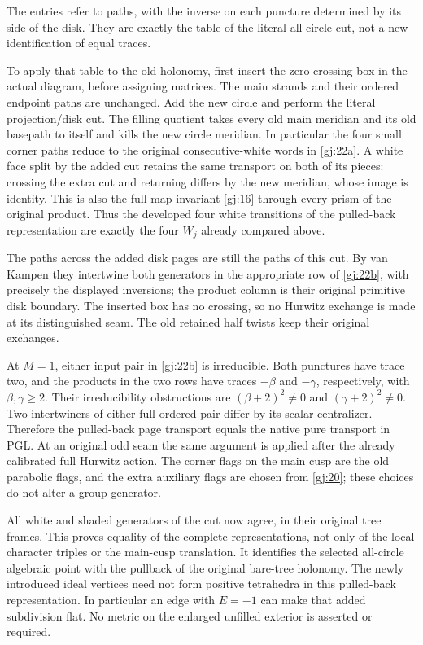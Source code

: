 The entries refer to paths, with the inverse on each puncture determined by its side of the disk. They are exactly the table of the literal all-circle cut, not a new identification of equal traces.

To apply that table to the old holonomy, first insert the zero-crossing box in the actual diagram, before assigning matrices. The main strands and their ordered endpoint paths are unchanged. Add the new circle and perform the literal projection/disk cut. The filling quotient takes every old main meridian and its old basepath to itself and kills the new circle meridian. In particular the four small corner paths reduce to the original consecutive-white words in \eqref{gj:22a}. A white face split by the added cut retains the same transport on both of its pieces: crossing the extra cut and returning differs by the new meridian, whose image is identity. This is also the full-map invariant \eqref{gj:16} through every prism of the original product. Thus the developed four white transitions of the pulled-back representation are exactly the four \(W_j\) already compared above.

The paths across the added disk pages are still the paths of this cut. By van Kampen they intertwine both generators in the appropriate row of \eqref{gj:22b}, with precisely the displayed inversions; the product column is their original primitive disk boundary. The inserted box has no crossing, so no Hurwitz exchange is made at its distinguished seam. The old retained half twists keep their original exchanges.

At \(M=1\), either input pair in \eqref{gj:22b} is irreducible. Both punctures have trace two, and the products in the two rows have traces \(-\beta\) and \(-\gamma\), respectively, with \(\beta,\gamma\ge2\). Their irreducibility obstructions are \((\beta+2)^2\ne0\) and \((\gamma+2)^2\ne0\). Two intertwiners of either full ordered pair differ by its scalar centralizer. Therefore the pulled-back page transport equals the native pure transport in PGL. At an original odd seam the same argument is applied after the already calibrated full Hurwitz action. The corner flags on the main cusp are the old parabolic flags, and the extra auxiliary flags are chosen from \eqref{gj:20}; these choices do not alter a group generator.

All white and shaded generators of the cut now agree, in their original tree frames. This proves equality of the complete representations, not only of the local character triples or the main-cusp translation. It identifies the selected all-circle algebraic point with the pullback of the original bare-tree holonomy. The newly introduced ideal vertices need not form positive tetrahedra in this pulled-back representation. In particular an edge with \(E=-1\) can make that added subdivision flat. No metric on the enlarged unfilled exterior is asserted or required.

